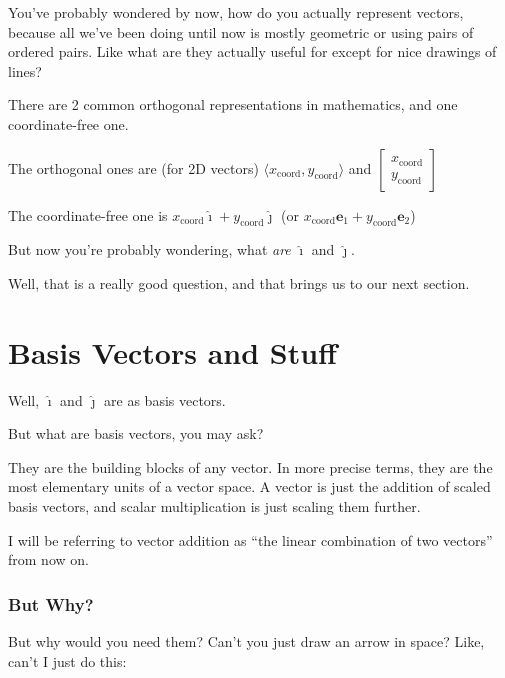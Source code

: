 \documentclass[12pt]{article}
\begin{document}
You've probably wondered by now, how do you actually represent vectors, because all we've been doing until now is mostly geometric or using pairs of ordered pairs. Like what are they actually useful for except for nice drawings of lines?

There are 2 common orthogonal representations in mathematics, and one coordinate-free one.

The orthogonal ones are (for 2D vectors)
$\langle x_{\text{coord}}, y_{\text{coord}} \rangle$ and $\begin{bmatrix}x_{\text{coord}} \\ y_{\text{coord}}\end{bmatrix}$

The coordinate-free one is
$x_{\text{coord}}\hat{\imath} + y_{\text{coord}}\hat{\jmath}$ (or $x_{\text{coord}}\mathbf{e}_1 + y_{\text{coord}}\mathbf{e}_2$)

But now you're probably wondering, what \emph{are} $\hat{\imath}$ and $\hat{\jmath}$.

Well, that is a really good question, and that brings us to our next section.

\section{Basis Vectors and Stuff}

Well, $\hat{\imath}$ and $\hat{\jmath}$ are as basis vectors.

But what are basis vectors, you may ask?

They are the building blocks of any vector. In more precise terms, they are the most elementary units of a vector space. A vector is just the addition of scaled basis vectors, and scalar multiplication is just scaling them further.

\begin{notebox}
    I will be referring to vector addition as ``the linear combination of two vectors'' from now on.
\end{notebox}

\subsubsection{But Why?}

But why would you need them? Can't you just draw an arrow in space? Like, can't I just do this:
\end{document}
